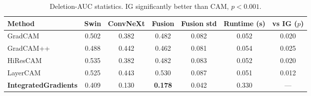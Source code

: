 \begin{table}[t]
\centering
\small
\caption{Deletion-AUC statistics. IG significantly better than CAM, $p<0.001$.}
\label{tab:deletion_auc_stats}
\begin{tabular}{lcccccc}
\toprule
\textbf{Method} & \textbf{Swin} & \textbf{ConvNeXt} & \textbf{Fusion} & \textbf{Fusion std} & \textbf{Runtime (s)} & \textbf{vs IG ($p$)} \\
\midrule
GradCAM & 0.502 & 0.382 & 0.482 & 0.082 & 0.052 & 0.020 \\
GradCAM++ & 0.488 & 0.442 & 0.462 & 0.081 & 0.054 & 0.025 \\
HiResCAM & 0.535 & 0.382 & 0.482 & 0.083 & 0.052 & 0.020 \\
LayerCAM & 0.525 & 0.443 & 0.530 & 0.087 & 0.051 & 0.012 \\
\textbf{IntegratedGradients} & 0.409 & 0.130 & \textbf{0.178} & 0.042 & 0.330 & — \\
\bottomrule
\end{tabular}
\end{table}

